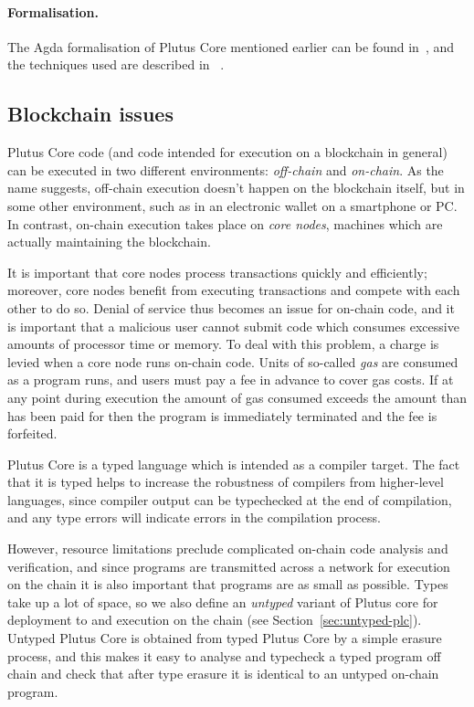 \documentclass[a4paper]{article}
\begin{document}
\paragraph{Formalisation.} The Agda formalisation of Plutus Core mentioned earlier
can be found in~\citep{Plutus-metatheory-repo},
and the techniques used are described in ~\citep{System-F-in-Agda}.

\subsection{Blockchain issues}
\label{sec:blockchain-issues}
Plutus Core code (and code intended for execution on a blockchain in
general) can be executed in two different environments:
\textit{off-chain} and \textit{on-chain}.  As the name suggests,
off-chain execution doesn't happen on the blockchain itself, but in
some other environment, such as in an electronic wallet on a
smartphone or PC.  In contrast, on-chain execution takes place on
\textit{core nodes}, machines which are actually maintaining the
blockchain.

It is important that core nodes process transactions quickly and
efficiently; moreover, core nodes benefit from executing transactions
and compete with each other to do so.  Denial of service thus becomes
an issue for on-chain code, and it is important that a malicious user
cannot submit code which consumes excessive amounts of processor time
or memory. To deal with this problem, a charge is levied when a core
node runs on-chain code.  Units of so-called \textit{gas} are consumed
as a program runs, and users must pay a fee in advance to cover gas
costs.  If at any point during execution the amount of gas consumed
exceeds the amount than has been paid for then the program is
immediately terminated and the fee is forfeited.

Plutus Core is a typed language which is intended as a compiler
target.  The fact that it is typed helps to increase the robustness of
compilers from higher-level languages, since compiler output can be
typechecked at the end of compilation, and any type errors will
indicate errors in the compilation process.

However, resource limitations preclude complicated on-chain code
analysis and verification, and since programs are transmitted across a
network for execution on the chain it is also important that programs
are as small as possible.  Types take up a lot of space, so we also
define an \textit{untyped} variant of Plutus core for deployment to
and execution on the chain (see Section~\ref{sec:untyped-plc}).
Untyped Plutus Core is obtained from typed Plutus Core by a simple
erasure process, and this makes it easy to analyse and typecheck
a typed program off chain and check that after type erasure it
is identical to an untyped on-chain program.
\end{document}
